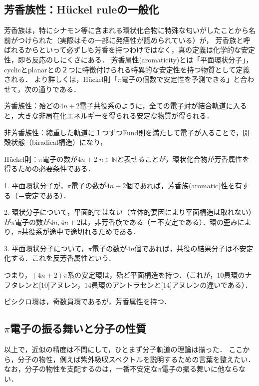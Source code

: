 \documentclass[uplatex, dvipdfmx]{jsreport}
\begin{document}
\subsection{芳香族性：H\"{u}ckel ruleの一般化} 
芳香族は，特にシナモン等に含まれる環状化合物に特殊な匂いがしたことから名前がつけられた（実際はその一部に発癌性が認められている）が，
芳香族と呼ばれるからといって必ずしも芳香を持つわけではなく，真の定義は化学的な安定性，即ち反応のしにくさにある．
芳香属性(aromaticity)とは「平面環状分子」，cyclicとplanarとの２つに特徴付けられる特異的な安定性を持つ物質として定義される．
より詳しくは，Hückel則「$\pi$電子の個数で安定性を予測できる」と合わせて，次の通りである．

\begin{definition}
    芳香族性：殆どの$4n+2$電子共役系のように，全ての電子対が結合軌道に入ると，大きな非局在化エネルギーを得られる安定な物質が得られる．

    非芳香族性：縮重した軌道に１つずつFund則を満たして電子が入ることで，開殻状態（biradical構造）になり，
\end{definition}
\begin{theory}
    Hückel則：$\pi$電子の数が$4n+2\; n\in\mathbb{N}$と表せることが，環状化合物が芳香属性を得るための必要条件である．

    1. 平面環状分子が，$\pi$電子の数が$4n+2$個であれば，芳香族(aromatic)性を有する（＝安定である）．

    2. 環状分子について，平面的ではない（立体的要因により平面構造は取れない）が$\pi$電子の数が$4n, 4n+2$は，非芳香族である（＝不安定である）．環の歪みにより，$\pi$共役系が途中で途切れるためである．

    3. 平面環状分子について，$\pi$電子の数が$4n$個であれば，共役の結果分子は不安定化する．これを反芳香属性という．

    つまり，$(4n+2)\pi$系の安定環は，殆ど平面構造を持つ．（これが，$10$員環のナフタレンと[10]アヌレン，$14$員環のアントラセンと[14]アヌレンの違いである）．
\end{theory}
\begin{remark}
    ビシクロ環は，奇数員環であるが，芳香属性を持つ．
\end{remark}

\subsection{$\pi$電子の振る舞いと分子の性質}
以上で，近似の精度は不問にして，ひとまず分子軌道の理論は揃った．
ここから，分子の物性，例えば紫外吸収スペクトルを説明するための言葉を整えたい．
なお，分子の物性を支配するのは，一番不安定な$\pi$電子の振る舞いに他ならない．
\end{document}
